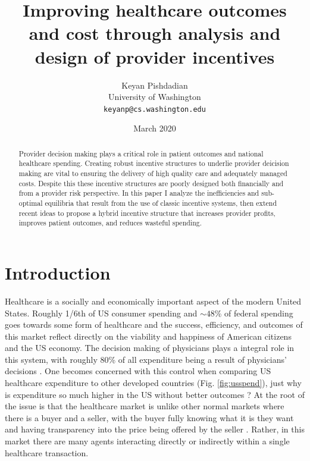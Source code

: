 \documentclass{article}
\begin{document}
\title{Improving healthcare outcomes and cost through analysis and design of provider incentives}
\author{Keyan Pishdadian\\University of Washington\\\texttt{keyanp@cs.washington.edu}}
\date{March 2020}

\maketitle

\begin{abstract}
Provider decision making plays a critical role in patient outcomes and national healthcare spending. Creating robust incentive structures to underlie provider deicision making are vital to ensuring the delivery of high quality care and adequately managed costs. Despite this these incentive structures are poorly designed both financially and from a provider risk perspective. In this paper I analyze the inefficiencies and sub-optimal equilibria that result from the use of classic incentive systems, then extend recent ideas to propose a hybrid incentive structure that increases provider profits, improves patient outcomes, and reduces wasteful spending.
\end{abstract}

\section*{Introduction}
Healthcare is a socially and economically important aspect of the modern United States. Roughly 1/6th of US consumer spending \cite{econharvard} and ${\sim}48$\% of federal spending \cite{federalspend} goes towards some form of healthcare and the success, efficiency, and outcomes of this market reflect directly on the viability and happiness of American citizens and the US economy. The decision making of physicians plays a integral role in this system, with roughly 80\% of all expenditure being a result of physicians' decisions \cite{trust}. One becomes concerned with this control when comparing US healthcare expenditure to other developed countries (Fig. \ref{fig:usspend}), just why is expenditure so much higher in the US without better outcomes \cite{acoecon}? At the root of the issue is that the healthcare market is unlike other normal markets where there is a buyer and a seller, with the buyer fully knowing what it is they want and having transparency into the price being offered by the seller \cite{msdt}. Rather, in this market there are many agents interacting directly or indirectly within a single healthcare transaction.
\end{document}
